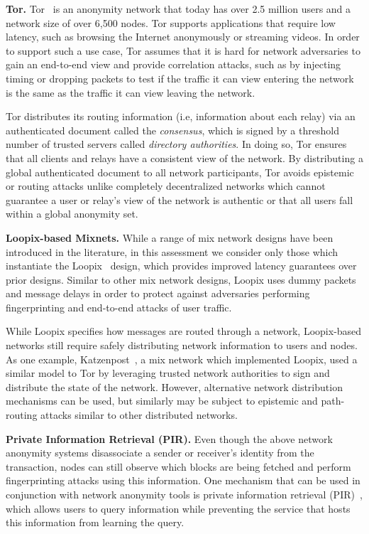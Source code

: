 \documentclass{article}
\begin{document}
\textbf{Tor.}
Tor~\cite{tor-specification} is an anonymity network that today has over 2.5
million users and a network
size of over 6,500 nodes. Tor supports applications that require low latency,
such as browsing the Internet anonymously or streaming videos. In order to
support such a use case, Tor assumes that it is hard for network adversaries to
gain an end-to-end view and provide correlation attacks, such as by injecting
timing or dropping packets to test if the traffic it can view entering the
network is the same as the traffic it can view leaving the network.

Tor distributes its routing information (i.e, information about each relay) via
an authenticated document called the \emph{consensus}, which is signed by a
threshold number of trusted servers called \emph{directory authorities}. In
doing so, Tor ensures that all clients and relays have a consistent view of the
network. By distributing a global authenticated document to all network
participants, Tor avoids epistemic or routing attacks unlike completely
decentralized networks which cannot guarantee a user or relay's view of the
network is authentic or that all users fall within a global anonymity set.


\textbf{Loopix-based Mixnets.}
While a range of mix network designs have been introduced in the literature, in
this assessment we consider only those which instantiate the
Loopix~\cite{Piotrowska:2017:LAS} design, which provides improved latency
guarantees over prior designs. Similar to other mix network designs, Loopix
uses dummy packets and message delays in order to protect against adversaries
performing fingerprinting and end-to-end attacks of user traffic.

While Loopix specifies how messages are routed through a network, Loopix-based
networks still require safely distributing network information to users and
nodes. As one example, Katzenpost~\cite{katzenpost}, a mix network which implemented
Loopix,  used a similar model to Tor
by leveraging trusted network authorities to sign and distribute the state of
the network. However, alternative network distribution mechanisms can be used,
but similarly may be subject to epistemic and path-routing attacks similar to
other distributed networks.

\textbf{Private Information Retrieval (PIR).}
Even though the above network anonymity systems disassociate a sender or
receiver's identity from the transaction, nodes can still observe which blocks
are being fetched and perform fingerprinting attacks using this information.
One mechanism that can be used in conjunction with network anonymity tools is
private information retrieval (PIR)~\cite{pir}, which allows users to query information
while preventing the service that hosts this information from learning the
query.
\end{document}
